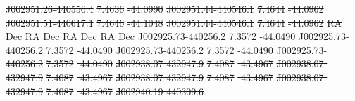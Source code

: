 \documentclass[11pt, a4paper]{book}
\providecommand{\DIFdeltex}[1]{{\protect\color{red}\sout{#1}}}                      %
\providecommand{\DIFdel}[1]{\texorpdfstring{\DIFdeltex{#1}}{}} %
\begin{document}
\DIFdel{J002951.26-440556.4 }%
\DIFdel{7.4636 }%
\DIFdel{-44.0990 }%
\DIFdel{J002951.44-440546.1 }%
\DIFdel{7.4644 }%
\DIFdel{-44.0962 }%
\DIFdel{J002951.51-440617.1 }%
\DIFdel{7.4646 }%
\DIFdel{-44.1048 }%
\DIFdel{J002951.44-440546.1 }%
\DIFdel{7.4644 }%
\DIFdel{-44.0962}%
\DIFdel{RA }%
\DIFdel{Dec }%
\DIFdel{RA }%
\DIFdel{Dec }%
\DIFdel{RA }%
\DIFdel{Dec }%
\DIFdel{RA }%
\DIFdel{Dec}%
\DIFdel{J002925.73-440256.2 }%
\DIFdel{7.3572 }%
\DIFdel{-44.0490 }%
\DIFdel{J002925.73-440256.2 }%
\DIFdel{7.3572 }%
\DIFdel{-44.0490 }%
\DIFdel{J002925.73-440256.2 }%
\DIFdel{7.3572 }%
\DIFdel{-44.0490 }%
\DIFdel{J002925.73-440256.2 }%
\DIFdel{7.3572 }%
\DIFdel{-44.0490}%
\DIFdel{J002938.07-432947.9 }%
\DIFdel{7.4087 }%
\DIFdel{-43.4967 }%
\DIFdel{J002938.07-432947.9 }%
\DIFdel{7.4087 }%
\DIFdel{-43.4967 }%
\DIFdel{J002938.07-432947.9 }%
\DIFdel{7.4087 }%
\DIFdel{-43.4967 }%
\DIFdel{J002938.07-432947.9 }%
\DIFdel{7.4087 }%
\DIFdel{-43.4967}%
\DIFdel{J002940.19-440309.6 }%
\end{document}
